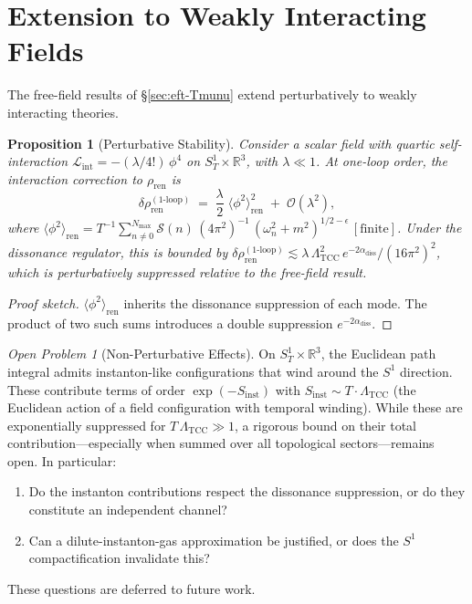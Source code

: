 \documentclass[12pt,openany]{book}
\theoremstyle{plain}
\newtheorem{eftproposition}[efttheorem]{Proposition}
\theoremstyle{definition}
\theoremstyle{remark}
\newtheorem{eftopenproblem}[efttheorem]{Open Problem}
\providecommand{\Ltcc}{\Lambda_{\mathrm{TCC}}}
\providecommand{\Nmax}{N_{\max}}
\providecommand{\vev}[1]{\langle #1 \rangle}
\providecommand{\order}[1]{\mathcal{O}\!\left(#1\right)}
\providecommand{\Ren}{\mathrm{ren}}
\providecommand{\diss}{\mathrm{diss}}
\providecommand{\SoneR}{S^{1}_{T}\!\times\!\mathbb{R}^{3}}
\begin{document}
\section{Extension to Weakly Interacting Fields}
\label{sec:eft-interactions}

The free-field results of \S\ref{sec:eft-Tmunu} extend perturbatively
to weakly interacting theories.

\begin{eftproposition}[Perturbative Stability]
\label{prop:perturbative}
Consider a scalar field with quartic self-interaction
$\mathcal{L}_{\mathrm{int}} = -(\lambda/4!)\,\phi^{4}$ on $\SoneR$,
with $\lambda \ll 1$.  At one-loop order, the interaction correction
to $\rho_{\Ren}$ is
\begin{equation}\label{eq:eft-one-loop}
  \delta\rho_{\Ren}^{(1\text{-loop})}
  \;=\;
  \frac{\lambda}{2}\;\vev{\phi^{2}}_{\Ren}^{2}
  \;+\; \order{\lambda^{2}},
\end{equation}
where
$\vev{\phi^{2}}_{\Ren}
= T^{-1}\!\sum_{n \neq 0}^{\Nmax}
  \mathcal{S}(n)\,(4\pi^{2})^{-1}\,
  (\omega_n^2+m^2)^{1/2-\epsilon}\,[\text{finite}]$.
Under the dissonance regulator, this is bounded by
$\delta\rho_{\Ren}^{(1\text{-loop})}
\lesssim \lambda\,\Ltcc^{2}\,e^{-2\alpha_{\diss}} / (16\pi^{2})^{2}$,
which is perturbatively suppressed relative to the free-field
result.
\end{eftproposition}

\begin{proof}[Proof sketch]
$\vev{\phi^{2}}_{\Ren}$ inherits the dissonance suppression of each
mode.  The product of two such sums introduces a double suppression
$e^{-2\alpha_{\diss}}$.
\end{proof}

\begin{eftopenproblem}[Non-Perturbative Effects]
\label{op:instantons}
On $\SoneR$, the Euclidean path integral admits instanton-like
configurations that wind around the $S^{1}$ direction.  These
contribute terms of order $\exp(-S_{\mathrm{inst}})$ with
$S_{\mathrm{inst}} \sim T \cdot \Ltcc$ (the Euclidean action of a
field configuration with temporal winding).  While these are
exponentially suppressed for $T\,\Ltcc \gg 1$, a rigorous bound on
their total contribution---especially when summed over all topological
sectors---remains open.  In particular:
\begin{enumerate}
  \item Do the instanton contributions respect the dissonance
    suppression, or do they constitute an independent channel?
  \item Can a dilute-instanton-gas approximation be justified, or
    does the $S^{1}$ compactification invalidate this?
\end{enumerate}
These questions are deferred to future work.
\end{eftopenproblem}
\end{document}
